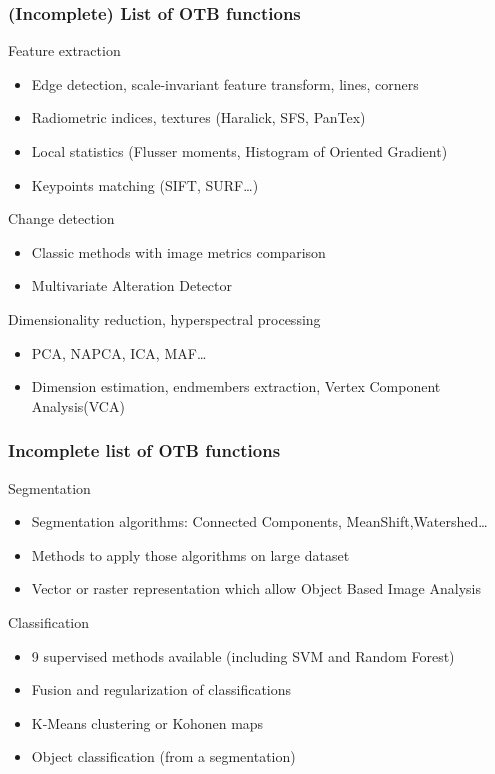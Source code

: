 \documentclass[8pt]{beamer}
\begin{document}
\begin{frame}
\frametitle{(Incomplete) List of OTB functions}

\begin{block}{Feature extraction}
\begin{itemize}
\item Edge detection, scale-invariant feature transform, lines, corners
\item Radiometric indices, textures (Haralick, SFS, PanTex)
\item Local statistics (Flusser moments, Histogram of Oriented Gradient)
\item Keypoints matching (SIFT, SURF\ldots)
\end{itemize}
\end{block}

\begin{block}{Change detection}
\begin{itemize}
\item Classic methods with image metrics comparison
\item Multivariate Alteration Detector
\end{itemize}
\end{block}

\begin{block}{Dimensionality reduction, hyperspectral processing}
\begin{itemize}
\item PCA, NAPCA, ICA, MAF\ldots
\item Dimension estimation, endmembers extraction, Vertex Component Analysis(VCA)
\end{itemize}
\end{block}

\end{frame}

\begin{frame}
\frametitle{Incomplete list of OTB functions}
\begin{block}{Segmentation}
\begin{itemize}
\item Segmentation algorithms: Connected Components, MeanShift,Watershed\ldots
\item Methods to apply those algorithms on large dataset
\item Vector or raster representation which allow Object Based Image Analysis
\end{itemize}
\end{block}

\begin{block}{Classification}
\begin{itemize}
\item 9 supervised methods available (including SVM and Random Forest)
\item Fusion and regularization of classifications
\item K-Means clustering or Kohonen maps
\item Object classification (from a segmentation)
\end{itemize}
\end{block}

\end{frame}
\end{document}
